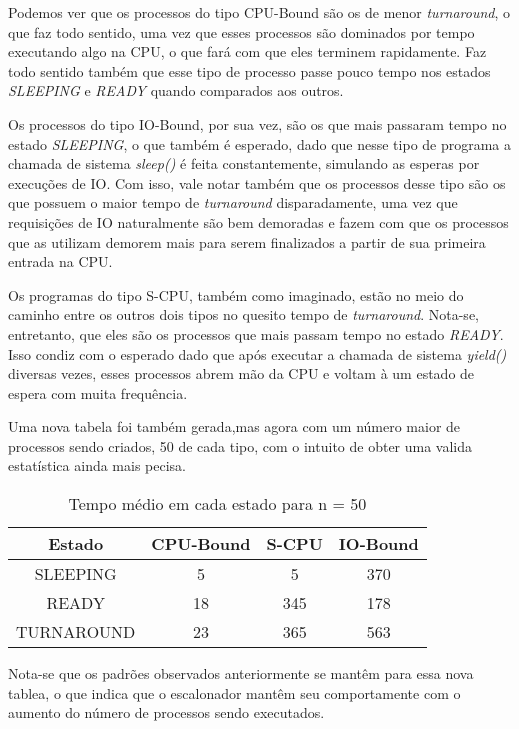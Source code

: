 \documentclass{article}
\begin{document}
Podemos ver que os processos do tipo CPU-Bound são os de menor
\textit{turnaround}, o que faz todo sentido, uma vez que esses processos são
dominados por tempo executando algo na CPU, o que fará com que eles terminem
rapidamente. Faz todo sentido também que esse tipo de processo passe pouco
tempo
nos estados \textit{SLEEPING} e \textit{READY} quando comparados aos outros.

Os processos do tipo IO-Bound, por sua vez, são os que mais passaram tempo no
estado \textit{SLEEPING}, o que também é esperado, dado que nesse tipo de
programa a chamada de sistema \textit{sleep()} é feita constantemente,
simulando as esperas por execuções de IO. Com isso, vale notar também que os
processos desse tipo são os que possuem o maior tempo de \textit{turnaround}
disparadamente, uma vez que requisições de IO naturalmente são bem demoradas e
fazem com que os processos que as utilizam demorem mais para serem finalizados
a partir de sua primeira entrada na CPU.

Os programas do tipo S-CPU, também como imaginado, estão no meio do caminho
entre os outros dois tipos no quesito tempo de \textit{turnaround}. Nota-se,
entretanto, que eles são os processos que mais passam tempo no estado
\textit{READY}. Isso condiz com o esperado dado que após executar a chamada de
sistema \textit{yield()} diversas vezes, esses processos abrem mão da CPU e
voltam à um estado de espera com muita frequência.

Uma nova tabela foi também gerada,mas agora com um número maior de processos
sendo criados, 50 de cada tipo, com o intuito de obter uma valida estatística
ainda mais pecisa.

\begin{table}[H]
      \centering
      \begin{tabular}{|c|c|c|c|}
            \hline
            Estado     & CPU-Bound & S-CPU &
            IO-Bound                             \\
            \hline
            SLEEPING   & 5         & 5     & 370 \\
            READY      & 18        & 345   & 178 \\
            TURNAROUND & 23        & 365   & 563 \\
            \hline
      \end{tabular}
      \caption{Tempo médio em cada estado para n = 50}
\end{table}

Nota-se que os padrões observados anteriormente se mantêm para essa nova
tablea, o que indica que o escalonador mantêm seu comportamente com o aumento
do número de processos sendo executados.
\end{document}
